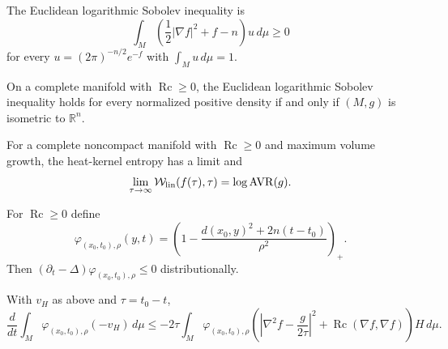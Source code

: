 \begin{definition}
\label{def:chow-ii-ch16-euclidean-log-sobolev}

The Euclidean logarithmic Sobolev inequality is
\[
\int_M\left(\frac12|\nabla f|^2+f-n\right)u\,d\mu\ge0
\]
for every $u=(2\pi)^{-n/2}e^{-f}$ with $\int_Mu\,d\mu=1$.
\end{definition}

\begin{theorem}
\label{thm:chow-ii-ch16-bakry-concordet-ledoux}


On a complete manifold with $\operatorname{Rc}\ge0$, the Euclidean logarithmic
Sobolev inequality holds for every normalized positive density if and only if
$(M,g)$ is isometric to $\mathbb R^n$.
\end{theorem}

\begin{theorem}
\label{thm:chow-ii-ch16-entropy-avr}


For a complete noncompact manifold with $\operatorname{Rc}\ge0$ and maximum
volume growth, the heat-kernel entropy has a limit and
\[
\lim_{\tau\to\infty}\mathcal W_{\rm lin}(f(\tau),\tau)=\log\operatorname{AVR}(g).
\]
\end{theorem}

\begin{definition}
\label{def:chow-ii-ch16-heat-cutoff}

For $\operatorname{Rc}\ge0$ define
\[
\varphi_{(x_0,t_0),\rho}(y,t)=\left(1-
 \frac{d(x_0,y)^2+2n(t-t_0)}{\rho^2}\right)_+.
\]
Then $(\partial_t-\Delta)\varphi_{(x_0,t_0),\rho}\le0$ distributionally.
\end{definition}

\begin{theorem}
\label{thm:chow-ii-ch16-local-linear-entropy}


With $v_H$ as above and $\tau=t_0-t$,
\[
\frac{d}{dt}\int_M\varphi_{(x_0,t_0),\rho}(-v_H)\,d\mu
\le-2\tau\int_M\varphi_{(x_0,t_0),\rho}
 \left(\left|\nabla^2f-\frac{g}{2\tau}\right|^2
 +\operatorname{Rc}(\nabla f,\nabla f)\right)H\,d\mu.
\]
\end{theorem}

